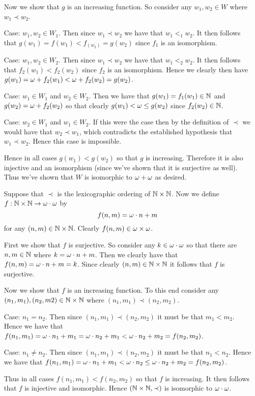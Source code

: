 \begin{solution}
    Now we show that $g$ is an increasing function.
    So consider any $w_1, w_2 \in W$ where $w_1 \prec w_2$.

    Case: $w_1, w_2 \in W_1$.
    Then since $w_1 \prec w_2$ we have that $w_1 <_1 w_2$.
    It then follows that $g(w_1) = f(w_1) < f_(w_2) = g(w_2)$ since $f_1$ is an isomorphism.

    Case: $w_1, w_2 \in W_2$.
    Then since $w_1 \prec w_2$ we have that $w_1 <_2 w_2$.
    It then follows that $f_2(w_1) < f_2(w_2)$ since $f_2$ is an isomorphism.
    Hence we clearly then have $g(w_1) = \omega + f_2(w_1) < \omega + f_2(w_2) = g(w_2)$.

    Case: $w_1 \in W_1$ and $w_2 \in W_2$.
    Then we have that $g(w_1) = f_1(w_1) \in \mathbb{N}$ and $g(w_2) = \omega + f_2(w_2)$ so that clearly $g(w_1) < \omega \leq g(w_2)$ since $f_2(w_2) \in \mathbb{N}$.

    Case: $w_2 \in W_1$ and $w_1 \in W_2$.
    If this were the case then by the definition of $\prec$ we would have that $w_2 \prec w_1$, which contradicts the established hypothesis that $w_1 \prec w_2$.
    Hence this case is impossible.

    Hence in all cases $g(w_1) < g(w_2)$ so that $g$ is increasing.
    Therefore it is also injective and an isomorphism (since we've shown that it is surjective as well).
    Thus we've shown that $W$ is isomorphic to $\omega + \omega$ as desired. \qedsymbol
\end{solution}


\begin{solution}
	Suppose that $\prec$ is the lexicographic ordering of $\mathbb{N} \times \mathbb{N}$.
    Now we define $f: \mathbb{N} \times \mathbb{N} \to \omega \cdot \omega$ by
    $$
    f(n,m) = \omega \cdot n + m
    $$
    for any $(n,m) \in \mathbb{N} \times \mathbb{N}$.
    Clearly $f(n,m) \in \omega \times \omega$.

    First we show that $f$ is surjective.
    So consider any $k \in \omega \cdot \omega$ so that there are $n,m \in \mathbb{N}$ where $k = \omega \cdot n + m$.
    Then we clearly have that $f(n,m) = \omega \cdot  n + m = k$.
    Since clearly $(n,m) \in \mathbb{N} \times \mathbb{N}$ it follows that $f$ is surjective.

    Now we show that $f$ is an increasing function.
    To this end consider any $(n_1, m_1), (n_2, m2) \in \mathbb{N} \times \mathbb{N}$ where $(n_1, m_1) \prec (n_2, m_2)$.

    Case: $n_1 = n_2$.
    Then since $(n_1, m_1) \prec (n_2, m_2)$ it must be that $m_1 < m_2$.
    Hence we have that $f(n_1, m_1) = \omega \cdot n_1 + m_1 = \omega \cdot n_2 + m_1 < \omega \cdot n_2 + m_2 = f(n_2, m_2)$.

    Case: $n_1 \neq n_2$.
    Then since $(n_1, m_1) \prec (n_2, m_2)$ it must be that $n_1 < n_2$.
    Hence we have that $f(n_1, m_1) = \omega \cdot n_1 + m_1 < \omega \cdot n_2 \leq \omega \cdot n_2 + m_2 = f(n_2, m_2)$.

    Thus in all cases $f(n_1, m_1) < f(n_2, m_2)$ so that $f$ is increasing.
    It then follows that $f$ is injective and isomorphic.
    Hence $(\mathbb{N} \times \mathbb{N}, \prec)$ is isomorphic to $\omega \cdot \omega$. \qedsymbol
\end{solution}


